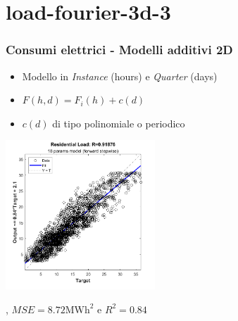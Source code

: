 \documentclass{beamer}
\begin{document}
\section{load-fourier-3d-3}
\begin{frame}
    \frametitle{Consumi elettrici - Modelli additivi 2D}   
    \begin{itemize}
        \item Modello in \textit{Instance} (hours) e \textit{Quarter} (days)
        \item $F(h, d)=F_i(h)+c(d)$
        \item $c(d)$ di tipo polinomiale o periodico
    \end{itemize}
    \vspace{0.3cm}
    \vfill
    \centering
    \includegraphics[width=0.42\textwidth,keepaspectratio]{all_residential_load_forw_plotregression.png} 

    \scriptsize {}, $MSE= 8.72\text{MWh}^2$ e $R^2=0.84$
\end{frame}

\end{document}
